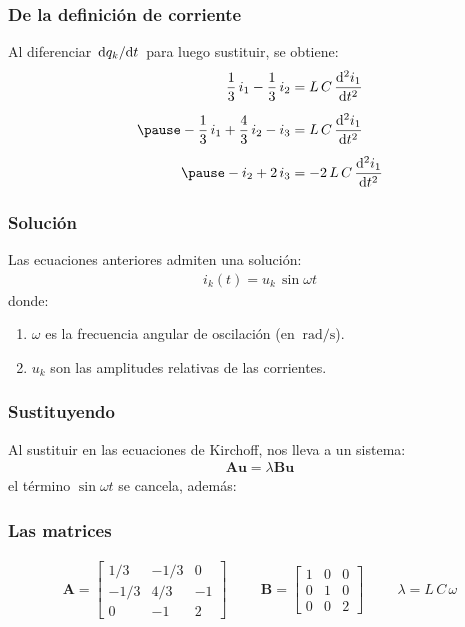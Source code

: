 \documentclass[12pt]{beamer}
\begin{document}
\begin{frame}
\frametitle{De la definición de corriente}
Al diferenciar $\dv*{q_{k}}{t}$ para luego sustituir, se obtiene:
\pause
\begin{eqnarray*}
\begin{aligned}
\dfrac{1}{3} \, i_{1} - \dfrac{1}{3} \, i_{2} &= L \, C \, \dv[2]{i_{1}}{t} \\[0.5em] \pause 
-\dfrac{1}{3} \, i_{1} + \dfrac{4}{3} \, i_{2} - i_{3} &= L \, C \, \dv[2]{i_{1}}{t} \\[0.5em] \pause 
- i_{2} + 2 \, i_{3} &= - 2 \, L \, C \, \dv[2]{i_{1}}{t}
\end{aligned}
\end{eqnarray*}
\end{frame}
\begin{frame}
\frametitle{Solución}
Las ecuaciones anteriores admiten una solución:
\pause
\begin{align*}
i_{k} (t) = u_{k} \, \sin \omega t
\end{align*}
\pause
donde:
\pause
{}
\begin{enumerate}[<+->]
\item $\omega$ es la frecuencia angular de oscilación (en $\SI{}{\radian\per\second}$).
\item $u_{k}$ son las amplitudes relativas de las corrientes.
\end{enumerate}
\end{frame}
\begin{frame}
\frametitle{Sustituyendo}
Al sustituir en las ecuaciones de Kirchoff, nos lleva a un sistema:
\pause
\begin{align*}
\mathbf{A u} = \lambda \mathbf{B u}
\end{align*}
el término $\sin \omega t$ se cancela, además:
\end{frame}
\begin{frame}
\frametitle{Las matrices}
\begin{align*}
\mathbf{A} = 
\begin{bmatrix}
1/3 & -1/3 & 0 \\
-1/3 & 4/3 & -1 \\
0 & -1 & 2
\end{bmatrix}
\hspace{1cm}
\mathbf{B} = 
\begin{bmatrix}
1 & 0 & 0 \\
0 & 1 & 0 \\
0 & 0 & 2
\end{bmatrix}
\hspace{1cm}
\lambda = L \, C \, \omega
\end{align*}
\end{frame}
\end{document}
